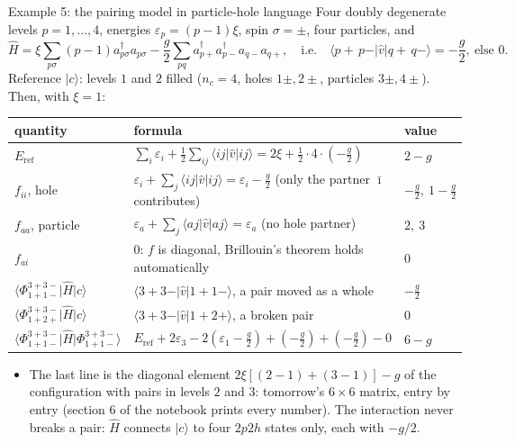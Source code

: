 \documentclass[aspectratio=169,10pt]{beamer}
\newcommand{\ket}[1]{\vert #1\rangle}
\newcommand{\bra}[1]{\langle #1\vert}
\newcommand{\element}[3]{\langle #1\vert #2\vert #3\rangle}
\begin{document}
\begin{frame}{Example 5: the pairing model in particle-hole language}
  \small
  Four doubly degenerate levels $p=1,\dots,4$, energies $\varepsilon_p=(p-1)\xi$, spin $\sigma=\pm$, four particles, and
  \[
    \hat{H}=\xi\sum_{p\sigma}(p-1)a^{\dagger}_{p\sigma}a_{p\sigma}
    -\frac{g}{2}\sum_{pq}a^{\dagger}_{p+}a^{\dagger}_{p-}a_{q-}a_{q+},
    \quad\text{i.e.}\quad
    \element{p+\,p-}{\hat{v}}{q+\,q-}=-\frac{g}{2},\ \text{else }0.
  \]
  \vspace{-0.6em}
  Reference $\ket{c}$: levels $1$ and $2$ filled ($n_c=4$, holes $1\pm,2\pm$, particles $3\pm,4\pm$). Then, with $\xi=1$:
  \begin{center}\scriptsize
  \renewcommand{\arraystretch}{1.15}
  \begin{tabular}{lll}
    \toprule
    quantity & formula & value\\
    \midrule
    $E_{\mathrm{ref}}$ & $\sum_i\varepsilon_i+\frac12\sum_{ij}\element{ij}{\hat{v}}{ij}=2\xi+\frac12\cdot4\cdot(-\tfrac{g}{2})$ & $2-g$\\
    $f_{ii}$, hole & $\varepsilon_i+\sum_j\element{ij}{\hat{v}}{ij}=\varepsilon_i-\tfrac{g}{2}$ (only the partner $\bar{\imath}$ contributes) & $-\tfrac{g}{2},\ 1-\tfrac{g}{2}$\\
    $f_{aa}$, particle & $\varepsilon_a+\sum_j\element{aj}{\hat{v}}{aj}=\varepsilon_a$ (no hole partner) & $2,\ 3$\\
    $f_{ai}$ & $0$: $f$ is diagonal, Brillouin's theorem holds automatically & $0$\\
    $\bra{\Phi_{1+1-}^{3+3-}}\hat{H}\ket{c}$ & $\element{3+3-}{\hat{v}}{1+1-}$, a pair moved as a whole & $-\tfrac{g}{2}$\\
    $\bra{\Phi_{1+2+}^{3+3-}}\hat{H}\ket{c}$ & $\element{3+3-}{\hat{v}}{1+2+}$, a broken pair & $0$\\
    $\bra{\Phi_{1+1-}^{3+3-}}\hat{H}\ket{\Phi_{1+1-}^{3+3-}}$ & $E_{\mathrm{ref}}+2\varepsilon_3-2(\varepsilon_1-\tfrac g2)+(-\tfrac g2)+(-\tfrac g2)-0$ & $6-g$\\
    \bottomrule
  \end{tabular}
  \end{center}
  \begin{itemize}
    \item The last line is the diagonal element $2\xi[(2-1)+(3-1)]-g$ of the configuration with pairs in levels $2$ and $3$: tomorrow's $6\times6$ matrix, entry by entry (section 6 of the notebook prints every number). The interaction never breaks a pair: $\hat{H}$ connects $\ket{c}$ to four $2p2h$ states only, each with $-g/2$.
  \end{itemize}
\end{frame}
\end{document}
